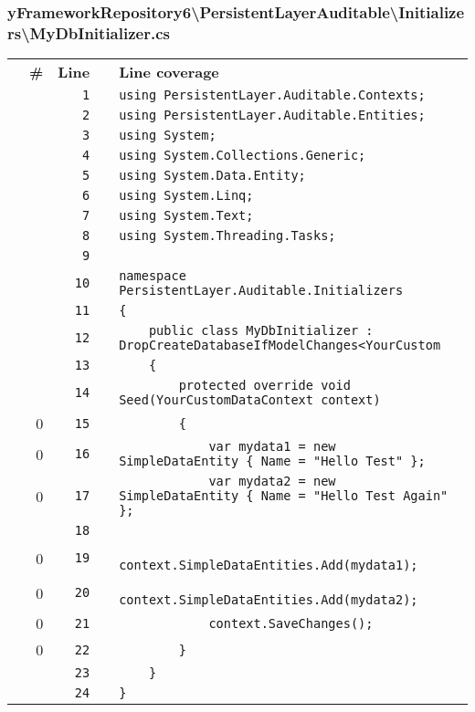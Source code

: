 \documentclass[a4paper,10pt]{article}
\begin{document}
\subsubsection{yFrameworkRepository6\textbackslash PersistentLayerAuditable\textbackslash Initializers\textbackslash MyDbInitializer.cs}
\begin{longtable}[l]{lrrll}
\textbf{} & \textbf{\#} & \textbf{Line} & \textbf{} & \textbf{Line coverage}\\
\cellcolor{gray} &  & \verb~1~ & & \verb~using PersistentLayer.Auditable.Contexts;~\\
\cellcolor{gray} &  & \verb~2~ & & \verb~using PersistentLayer.Auditable.Entities;~\\
\cellcolor{gray} &  & \verb~3~ & & \verb~using System;~\\
\cellcolor{gray} &  & \verb~4~ & & \verb~using System.Collections.Generic;~\\
\cellcolor{gray} &  & \verb~5~ & & \verb~using System.Data.Entity;~\\
\cellcolor{gray} &  & \verb~6~ & & \verb~using System.Linq;~\\
\cellcolor{gray} &  & \verb~7~ & & \verb~using System.Text;~\\
\cellcolor{gray} &  & \verb~8~ & & \verb~using System.Threading.Tasks;~\\
\cellcolor{gray} &  & \verb~9~ & & \verb~~\\
\cellcolor{gray} &  & \verb~10~ & & \verb~namespace PersistentLayer.Auditable.Initializers~\\
\cellcolor{gray} &  & \verb~11~ & & \verb~{~\\
\cellcolor{gray} &  & \verb~12~ & & \verb~    public class MyDbInitializer : DropCreateDatabaseIfModelChanges<YourCustom~\\
\cellcolor{gray} &  & \verb~13~ & & \verb~    {~\\
\cellcolor{gray} &  & \verb~14~ & & \verb~        protected override void Seed(YourCustomDataContext context)~\\
\cellcolor{red} & 0 & \verb~15~ & & \verb~        {~\\
\cellcolor{red} & 0 & \verb~16~ & & \verb~            var mydata1 = new SimpleDataEntity { Name = "Hello Test" };~\\
\cellcolor{red} & 0 & \verb~17~ & & \verb~            var mydata2 = new SimpleDataEntity { Name = "Hello Test Again" };~\\
\cellcolor{gray} &  & \verb~18~ & & \verb~~\\
\cellcolor{red} & 0 & \verb~19~ & & \verb~            context.SimpleDataEntities.Add(mydata1);~\\
\cellcolor{red} & 0 & \verb~20~ & & \verb~            context.SimpleDataEntities.Add(mydata2);~\\
\cellcolor{red} & 0 & \verb~21~ & & \verb~            context.SaveChanges();~\\
\cellcolor{red} & 0 & \verb~22~ & & \verb~        }~\\
\cellcolor{gray} &  & \verb~23~ & & \verb~    }~\\
\cellcolor{gray} &  & \verb~24~ & & \verb~}~\\
\end{longtable}
\newpage
\end{document}
